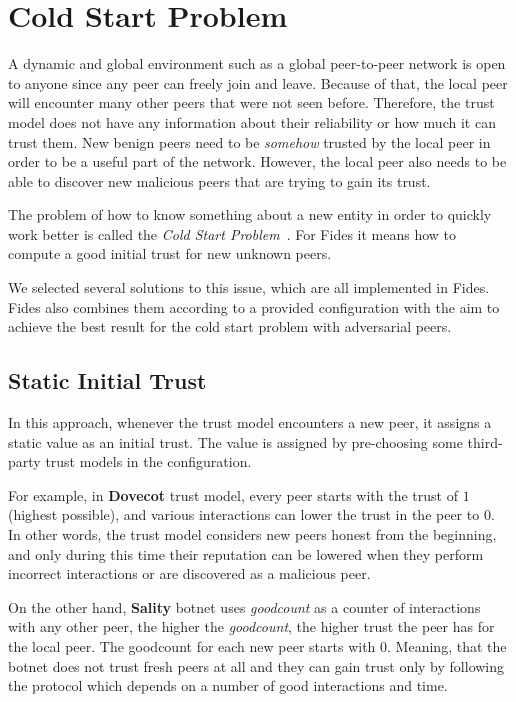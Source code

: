 \section{Cold Start Problem}
\label{sec:cold-start-problem}
A dynamic and global environment such as a global peer-to-peer network is open to anyone since any peer can freely join and leave. Because of that, the local peer will encounter many other peers that were not seen before. Therefore, the trust model does not have any information about their reliability or how much it can trust them. 
New benign peers need to be \textit{somehow} trusted by the local peer in order to be a useful part of the network. However, the local peer also needs to be able to discover new malicious peers that are trying to gain its trust.

The problem of how to know something about a new entity in order to quickly work better is called the \textit{Cold Start Problem}~\cite{christensen2014hybrid}. For Fides it means how to compute a good initial trust for new unknown peers. 

We selected several solutions to this issue, which are all implemented in Fides. Fides also combines them according to a provided configuration with the aim to achieve the best result for the cold start problem with adversarial peers.

\subsection{Static Initial Trust}
\label{subsec:static-initial-trust}
In this approach, whenever the trust model encounters a new peer, it assigns a static value as an initial trust. The value is assigned by pre-choosing some third-party trust models in the configuration.

For example, in \textbf{Dovecot} trust model, every peer starts with the trust of $1$ (highest possible), and various interactions can lower the trust in the peer to $0$. In other words, the trust model considers new peers honest from the beginning, and only during this time their reputation can be lowered when they perform incorrect interactions or are discovered as a malicious peer.

On the other hand, \textbf{Sality} botnet uses \textit{goodcount} as a counter of interactions with any other peer, the higher the \textit{goodcount}, the higher trust the peer has for the local peer. The goodcount for each new peer starts with $0$. Meaning, that the botnet does not trust fresh peers at all and they can gain trust only by following the protocol which depends on a number of good interactions and time.

